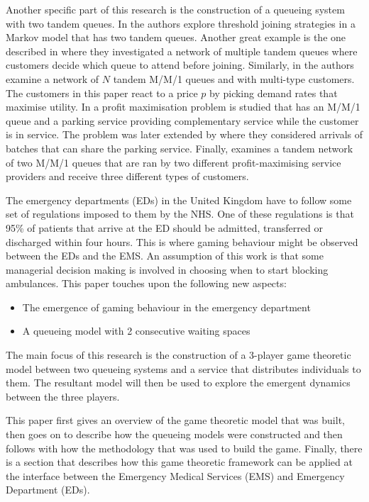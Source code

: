Another specific part of this research is the construction of a queueing system
with two tandem queues.
In \cite{d2015pure} the authors explore threshold joining strategies in a 
Markov model that has two tandem queues.
Another great example is the one described in \cite{burnetas2013customer}
where they investigated a network of multiple tandem queues where customers 
decide which queue to attend before joining.
Similarly, in \cite{bacsar2002stackelberg} the authors examine a network of 
\(N\) tandem M/M/1 queues and with multi-type customers. 
The customers in this paper react to a price \(p\) by picking demand rates that 
maximise utility.
In \cite{veltman2005equilibrium} a profit maximisation problem is studied that
has an M/M/1 queue and a parking service providing complementary service while
the customer is in service. 
The problem was later extended by \cite{sun2009equilibrium} where they 
considered arrivals of batches that can share the parking service.
Finally, \cite{afeche2007decentralized} examines a tandem network of two M/M/1 
queues that are ran by two different profit-maximising service providers and 
receive three different types of customers.


The emergency departments (EDs) in the United Kingdom have to follow some set 
of regulations imposed to them by the NHS.
One of these regulations is that 95\% of patients that arrive at the ED should 
be admitted, transferred or discharged within four hours.
This is where gaming behaviour might be observed between the EDs and the EMS.
An assumption of this work is that some managerial decision making is involved
in choosing when to start blocking ambulances.
This paper touches upon the following new aspects:
\begin{itemize}
    \item The emergence of gaming behaviour in the emergency department
    \item A queueing model with 2 consecutive waiting spaces
\end{itemize}

The main focus of this research is the construction of a 3-player game 
theoretic model between two queueing systems and a service that distributes 
individuals to them. 
The resultant model will then be used to explore the emergent dynamics between 
the three players.

This paper first gives an overview of the game theoretic model that was built, 
then goes on to describe how the queueing models were constructed and then 
follows with how the methodology that was used to build the game.
Finally, there is a section that describes how this game theoretic framework
can be applied at the interface between the Emergency Medical Services (EMS) 
and Emergency Department (EDs).






